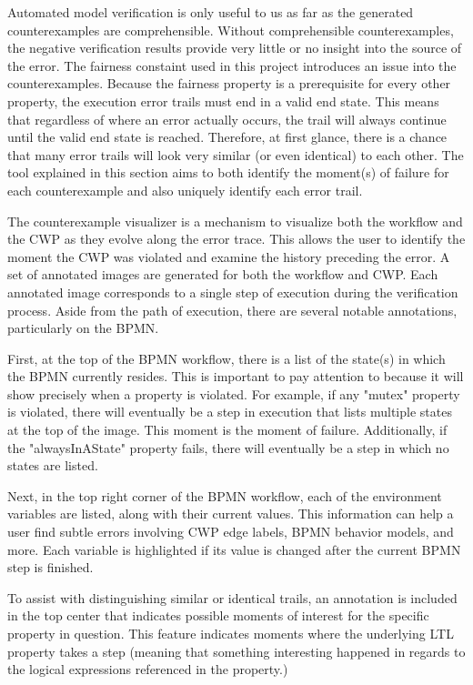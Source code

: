 Automated model verification is only useful to us as far as the generated counterexamples are comprehensible. Without comprehensible counterexamples, the negative verification results provide very little or no insight into the source of the error. The fairness constaint used in this project introduces an issue into the counterexamples. Because the fairness property is a prerequisite for every other property, the execution error trails must end in a valid end state. This means that regardless of where an error actually occurs, the trail will always continue until the valid end state is reached. Therefore, at first glance, there is a chance that many error trails will look very similar (or even identical) to each other. The tool explained in this section aims to both identify the moment(s) of failure for each counterexample and also uniquely identify each error trail.

The counterexample visualizer is a mechanism to visualize both the workflow and the CWP as they evolve along the error trace. This allows the user to identify the moment the CWP was violated and examine the history preceding the error. A set of annotated images are generated for both the workflow and CWP. Each annotated image corresponds to a single step of execution during the verification process. Aside from the path of execution, there are several notable annotations, particularly on the BPMN.

First, at the top of the BPMN workflow, there is a list of the state(s) in which the BPMN currently resides. This is important to pay attention to because it will show precisely when a property is violated. For example, if any "mutex" property is violated, there will eventually be a step in execution that lists multiple states at the top of the image. This moment is the moment of failure. Additionally, if the "alwaysInAState" property fails, there will eventually be a step in which no states are listed.

Next, in the top right corner of the BPMN workflow, each of the environment variables are listed, along with their current values. This information can help a user find subtle errors involving CWP edge labels, BPMN behavior models, and more. Each variable is highlighted if its value is changed after the current BPMN step is finished.

To assist with distinguishing similar or identical trails, an annotation is included in the top center that indicates possible moments of interest for the specific property in question. This feature indicates moments where the underlying LTL property takes a step (meaning that something interesting happened in regards to the logical expressions referenced in the property.)

